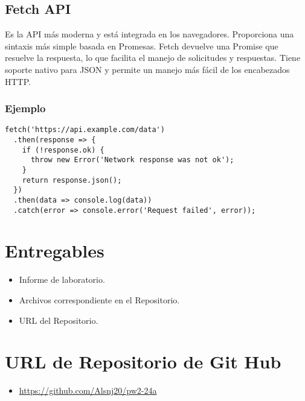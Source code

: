\documentclass{article}
\begin{document}
\subsection{Fetch API}
\item{Es la API más moderna y está integrada en los navegadores.
Proporciona una sintaxis más simple basada en Promesas. Fetch devuelve una Promise que resuelve la respuesta, lo que facilita el manejo de solicitudes y respuestas. Tiene soporte nativo para JSON y permite un manejo más fácil de los encabezados HTTP.}
\subsubsection{Ejemplo}
\begin{lstlisting}[style=ascii-tree]
fetch('https://api.example.com/data')
  .then(response => {
    if (!response.ok) {
      throw new Error('Network response was not ok');
    }
    return response.json();
  })
  .then(data => console.log(data))
  .catch(error => console.error('Request failed', error));
\end{lstlisting}

\section{Entregables}
\begin{itemize}
    \item Informe de laboratorio.
    \item Archivos correspondiente en el Repositorio.
    \item URL del Repositorio.
\end{itemize}

\section{URL de Repositorio de Git Hub}
\begin{itemize}
	\item \url{https://github.com/Alsnj20/pw2-24a}
\end{itemize}

\newpage
\end{document}
